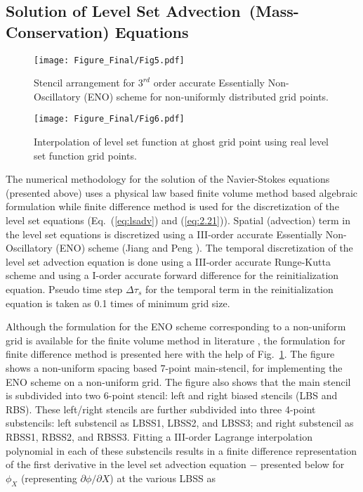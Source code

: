 \documentclass[preprint,12pt]{elsarticle}
\begin{document}
\subsection{Solution of Level Set Advection~(Mass-Conservation) Equations}\label{sub:Solution-of-Level}

\begin{figure}
\begin{centering}
\texttt{[image: Figure\_Final/Fig5.pdf]}
\par\end{centering}

\protect\caption{\label{fig:Stencil-arrangement-in}Stencil arrangement for $3^{rd}$
order accurate Essentially Non-Oscillatory (ENO) scheme for non-uniformly
distributed grid points.}
\end{figure}

\begin{figure}
\begin{centering}
\texttt{[image: Figure\_Final/Fig6.pdf]}
\par\end{centering}

\protect\caption{\label{fig:Ghost-level-set} Interpolation of level set function at
ghost grid point using real level set function grid points.}
\end{figure}


The numerical methodology for the solution of the Navier-Stokes equations
(presented above) uses a physical law based finite volume method based algebraic formulation \cite{Sharma2017} while finite difference method
is used for the discretization of the level set equations (Eq.~(\ref{eq:lsadv})
and (\ref{eq:2.21})). Spatial (advection) term in the level set equations
is discretized using a III-order accurate Essentially Non-Oscillatory
(ENO) scheme (Jiang and Peng \cite{jiang2000}). The temporal discretization
of the level set advection equation is done using a III-order accurate
Runge-Kutta scheme and using a I-order accurate forward difference
for the reinitialization equation. Pseudo time step $\Delta\tau_{s}$
for the temporal term in the reinitialization equation is taken as
0.1 times of minimum grid size.

Although the formulation for the ENO scheme corresponding to a non-uniform
grid is available for the finite volume method in literature \cite{smit2005},
the formulation for finite difference method is presented here with
the help of Fig.~\ref{fig:Stencil-arrangement-in}. The figure shows
a non-uniform spacing based 7-point main-stencil, for implementing the ENO scheme on a non-uniform grid.
The figure also shows that the main stencil is subdivided into two
6-point stencil: left and right biased stencils (LBS and RBS). These
left/right stencils are further subdivided into three 4-point substencils:
left substencil as LBSS1, LBSS2, and LBSS3; and right substencil as
RBSS1, RBSS2, and RBSS3. Fitting a III-order Lagrange interpolation
polynomial in each of these substencils results in a finite difference
representation of the first derivative in the level set advection
equation $-$ presented below for $\phi_{X}$ (representing ${\partial\phi}/{\partial X}$)
at the various LBSS as
\end{document}
